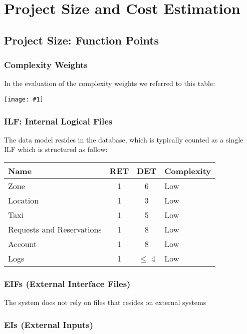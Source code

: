 \documentclass[11pt, a4paper,titlepage]{article}
\newcommand{\image}[1]{
	\begin{center}
		\noindent \texttt{[image: \#1]}
	\end{center}
}
\begin{document}
	\section{Project Size and Cost Estimation}
		\subsection{Project Size: Function Points}
		\subsubsection{Complexity Weights}
		In the evaluation of the complexity weights we referred to this table: \newline
		\image{fp_weights.png}
		\newpage
		\subsubsection{ILF: Internal Logical Files}
		The data model resides in the database, which is typically counted as a single ILF which is structured as follow:
		\newline
		\begin{tabularx}{\textwidth}{|X|c|c|l|}
			\hline
			\textbf{Name} &	\textbf{RET} & \textbf{DET} & \textbf{Complexity} \\
			\hline
			Zone & 1 & 6 & Low \\
			Location & 1 & 3 & Low \\
			Taxi & 1 & 5 & Low \\
			Requests and Reservations & 1 & 8 & Low \\
			Account & 1 & 8 & Low \\
			Logs & 1 & $\le$ 4 & Low \\
			\hline
		\end{tabularx}
		
		\subsubsection{EIFs (External Interface Files)}
		The system does not rely on files that resides on external systems
		\subsubsection{EIs (External Inputs)}
				
\end{document}
